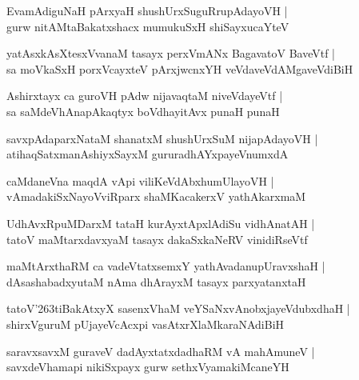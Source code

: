 \documentclass[twoside,12pt,openright]{book}
\def\S{\char'263}
\newcounter{shloka}[chapter]
\begin{document}
\begin{shloka}%
EvamAdiguNaH pArxyaH shushUrxSuguRrupAdayoVH |\\
gurw nitAMtaBakatxshacx mumukuSxH  shiSayxucaYteV 
\end{shloka}

\begin{shloka}%
yatAsxkAsXtesxVvanaM tasayx perxVmANx BagavatoV BaveVtf |\\
sa moVkaSxH porxVcayxteV pArxjwcnxYH veVdaveVdAMgaveVdiBiH
\end{shloka}

\begin{shloka}%
Ashirxtayx ca guroVH pAdw nijavaqtaM niveVdayeVtf |\\
sa saMdeVhAnapAkaqtyx boVdhayitAvx punaH punaH 
\end{shloka}

\begin{shloka}%
savxpAdaparxNataM shanatxM shushUrxSuM nijapAdayoVH |\\
atihaqSatxmanAshiyxSayxM gururadhAYxpayeVnumxdA 
\end{shloka}

\begin{shloka}%
caMdaneVna maqdA vApi viliKeVdAbxhumUlayoVH |\\
vAmadakiSxNayoVviRparx shaMKacakerxV yathAkarxmaM 
\end{shloka}

\begin{shloka}%
UdhAvxRpuMDarxM tataH kurAyxtApxlAdiSu vidhAnatAH |\\
tatoV maMtarxdavxyaM tasayx dakaSxkaNeRV vinidiRseVtf
\end{shloka}

\begin{shloka}%
maMtArxthaRM ca vadeVtatxsemxY yathAvadanupUravxshaH |\\
dAsashabadxyutaM nAma dhArayxM tasayx parxyatanxtaH 
\end{shloka}

\begin{shloka}%
tatoV\S tiBakAtxyX sasenxVhaM veYSaNxvAnobxjayeVdubxdhaH |\\
shirxVguruM pUjayeVcAcxpi vasAtxrXlaMkaraNAdiBiH 
\end{shloka}

\begin{shloka}%
saravxsavxM guraveV dadAyxtatxdadhaRM vA mahAmuneV |\\
savxdeVhamapi nikiSxpayx gurw sethxVyamakiMcaneYH 
\end{shloka}
\end{document}
